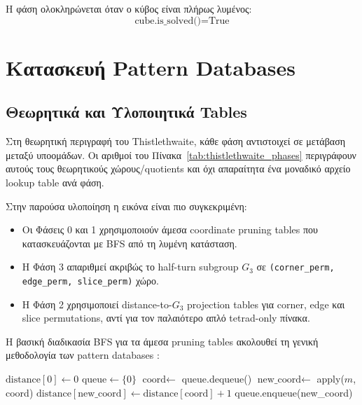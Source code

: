 Η φάση ολοκληρώνεται όταν ο κύβος είναι πλήρως λυμένος:
\begin{equation}
    \text{cube.is\_solved()} = \text{True}
\end{equation}


\section{Κατασκευή Pattern Databases}
\label{sec:thistlethwaite_pdb}

\subsection{Θεωρητικά και Υλοποιητικά Tables}

Στη θεωρητική περιγραφή του Thistlethwaite, κάθε φάση αντιστοιχεί σε μετάβαση
μεταξύ υποομάδων. Οι αριθμοί του Πίνακα~\ref{tab:thistlethwaite_phases}
περιγράφουν αυτούς τους θεωρητικούς χώρους/quotients και όχι απαραίτητα ένα
μοναδικό αρχείο lookup table ανά φάση.

Στην παρούσα υλοποίηση η εικόνα είναι πιο συγκεκριμένη:
\begin{itemize}
    \item Οι Φάσεις 0 και 1 χρησιμοποιούν άμεσα coordinate pruning tables που
    κατασκευάζονται με BFS από τη λυμένη κατάσταση.
    \item Η Φάση 3 απαριθμεί ακριβώς το half-turn subgroup $G_3$ σε
    \texttt{(corner\_perm, edge\_perm, slice\_perm)} χώρο.
    \item Η Φάση 2 χρησιμοποιεί distance-to-$G_3$ projection tables για corner,
    edge και slice permutations, αντί για τον παλαιότερο απλό tetrad-only
    πίνακα.
\end{itemize}

Η βασική διαδικασία BFS για τα άμεσα pruning tables ακολουθεί τη γενική
μεθοδολογία των pattern databases \cite{culberson1998pattern}:

\begin{algorithm}[H]
\caption{Κατασκευή Pattern Database}
\begin{algorithmic}[1]
\State $\text{distance}[0] \gets 0$ 
\State $\text{queue} \gets \{0\}$
    \State $\text{coord} \gets$ queue.dequeue()
        \State $\text{new\_coord} \gets$ apply($m$, coord)
            \State $\text{distance}[\text{new\_coord}] \gets \text{distance}[\text{coord}] + 1$
            \State queue.enqueue(new\_coord)
        \EndIf
    \EndFor
\EndWhile
\end{algorithmic}
\end{algorithm}

